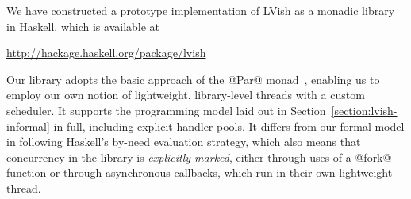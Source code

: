 

%


We have constructed a prototype implementation of LVish as a monadic library in
Haskell, which is available at 
\begin{center}
\url{http://hackage.haskell.org/package/lvish}
\end{center}
%
Our library adopts the basic approach
of the @Par@ monad~\cite{monad-par}, enabling us to employ our own notion of
lightweight, library-level threads with a custom scheduler.  It supports the
programming model laid out in Section~\ref{section:lvish-informal} in full,
including explicit handler pools.  It differs from our formal model in following
Haskell's by-need evaluation strategy, which also means that concurrency in the
library is \emph{explicitly marked}, either through uses of a @fork@ function or
through asynchronous callbacks, which run in their own lightweight thread.

